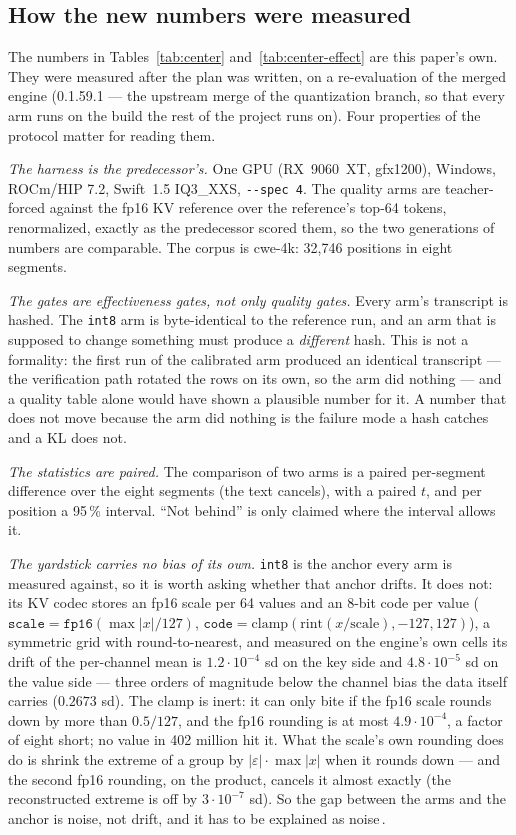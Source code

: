 \documentclass[10pt,twocolumn]{article}
\begin{document}
\subsection{How the new numbers were measured}

The numbers in Tables~\ref{tab:center} and~\ref{tab:center-effect} are this paper's own. They were measured after the plan was written, on a re-evaluation of the merged engine (0.1.59.1 --- the upstream merge of the quantization branch, so that every arm runs on the build the rest of the project runs on). Four properties of the protocol matter for reading them.

\emph{The harness is the predecessor's.} One GPU (RX~9060~XT, gfx1200), Windows, ROCm/HIP 7.2, Swift~1.5 IQ3\_XXS, \texttt{-{}-spec 4}. The quality arms are teacher-forced against the fp16 KV reference over the reference's top-64 tokens, renormalized, exactly as the predecessor scored them, so the two generations of numbers are comparable. The corpus is cwe-4k: 32,746 positions in eight segments.

\emph{The gates are effectiveness gates, not only quality gates.} Every arm's transcript is hashed. The \texttt{int8} arm is byte-identical to the reference run, and an arm that is supposed to change something must produce a \emph{different} hash. This is not a formality: the first run of the calibrated arm produced an identical transcript --- the verification path rotated the rows on its own, so the arm did nothing --- and a quality table alone would have shown a plausible number for it. A number that does not move because the arm did nothing is the failure mode a hash catches and a KL does not.

\emph{The statistics are paired.} The comparison of two arms is a paired per-segment difference over the eight segments (the text cancels), with a paired $t$, and per position a 95\,\% interval. ``Not behind'' is only claimed where the interval allows it.

\emph{The yardstick carries no bias of its own.} \texttt{int8} is the anchor every arm is measured against, so it is worth asking whether that anchor drifts. It does not: its KV codec stores an fp16 scale per 64 values and an 8-bit code per value ($\texttt{scale} = \texttt{fp16}(\max|x|/127)$, $\texttt{code} = \mathrm{clamp}(\mathrm{rint}(x/\mathrm{scale}), -127, 127)$), a symmetric grid with round-to-nearest, and measured on the engine's own cells its drift of the per-channel mean is $1.2\cdot10^{-4}$ sd on the key side and $4.8\cdot10^{-5}$ sd on the value side --- three orders of magnitude below the channel bias the data itself carries ($0.2673$ sd). The clamp is inert: it can only bite if the fp16 scale rounds down by more than $0.5/127$, and the fp16 rounding is at most $4.9\cdot10^{-4}$, a factor of eight short; no value in 402 million hit it. What the scale's own rounding does do is shrink the extreme of a group by $|\varepsilon|\cdot\max|x|$ when it rounds down --- and the second fp16 rounding, on the product, cancels it almost exactly (the reconstructed extreme is off by $3\cdot10^{-7}$ sd). So the gap between the arms and the anchor is noise, not drift, and it has to be explained as noise\,\cite{strata-bias}.
\end{document}
